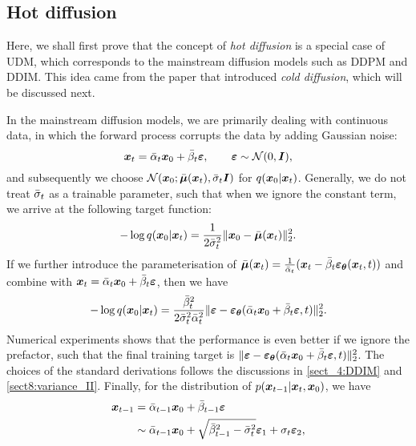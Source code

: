 \subsection{Hot diffusion}
Here, we shall first prove that the concept of \emph{hot diffusion} is a special case of UDM, which corresponds to the mainstream diffusion models such as DDPM and DDIM. This idea came from the paper that introduced \emph{cold diffusion}, which will be discussed next.

In the mainstream diffusion models, we are primarily dealing with continuous data, in which the forward process corrupts the data by adding Gaussian noise:
\begin{equation}
    \label{eq:11.6}
\bm{x}_{t}=\bar{\alpha}_t\bm{x}_0+\bar{\beta}_t\bm{\varepsilon},\qquad \bm{\varepsilon}\sim\mathcal{N}(0,\bm{I}),
\end{equation}
and subsequently we choose $\mathcal{N}(\bm{x}_0;\bar{\bm{\mu}}(\bm{x}_{t}),\bar{\sigma}_t\bm{I})$ for $q(\bm{x}_0|\bm{x}_{t})$. Generally, we do not treat $\bar{\sigma}_t$ as a trainable parameter, such that when we ignore the constant term, we arrive at the following target function:
\begin{equation}
    \label{eq:11.7}
    -\log q(\bm{x}_0|\bm{x}_{t})=\frac{1}{2\bar{\sigma}_t^2}\|\bm{x}_0-\bar{\bm{\mu}}(\bm{x}_{t}) \|_2^2.
\end{equation}
If we further introduce the parameterisation of $\bar{\bm{\mu}}(\bm{x}_{t})=\frac{1}{\bar{\alpha}_t}(\bm{x}_{t}-\bar{\beta}_t\bm{\varepsilon}_{\bm{\theta}}(\bm{x}_{t},t))$ and combine with $\bm{x}_{t}=\bar{\alpha}_t\bm{x}_0+\bar{\beta}_t\bm{\varepsilon}$, then we have
\begin{equation}
    \label{eq:11.8}
    -\log q(\bm{x}_0|\bm{x}_{t})=\frac{\bar{\beta}_t^2}{2\bar{\sigma}_t^2\bar{\alpha}_t^2}\|\bm{\varepsilon}- \bm{\varepsilon}_{\bm{\theta}}(\bar{\alpha}_t\bm{x}_0+\bar{\beta}_t\bm{\varepsilon},t)\|_2^2.
\end{equation}
Numerical experiments shows that the performance is even better if we ignore the prefactor, such that the final training target is $\|\bm{\varepsilon}- \bm{\varepsilon}_{\bm{\theta}}(\bar{\alpha}_t\bm{x}_0+\bar{\beta}_t\bm{\varepsilon},t)\|_2^2$. The choices of the standard derivations follows the discussions in \cref{sect_4:DDIM} and \cref{sect8:variance_II}. Finally, for the distribution of $p(\bm{x}_{t-1}|\bm{x}_{t},\bm{x}_0)$, we have
\begin{align}
    \bm{x}_{t-1}&= \bar{\alpha}_{t-1}\bm{x}_0+\bar{\beta}_{t-1}\bm{\varepsilon} \nonumber\\
    &\sim\bar{\alpha}_{t-1}\bm{x}_0+\sqrt{\bar{\beta}_{t-1}^2-\bar{\sigma}_t^2}\bm{\varepsilon}_1+\sigma_t\bm{\varepsilon}_2, \label{eq:11.10}
\end{align}
